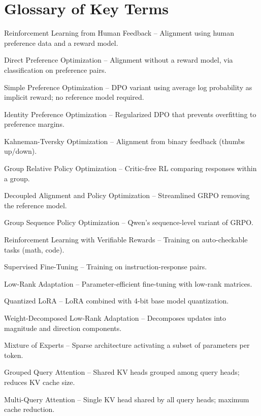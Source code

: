 \chapter{Glossary of Key Terms}

\begin{description}[style=nextline, leftmargin=2cm]
  \item[RLHF] Reinforcement Learning from Human Feedback -- Alignment using human preference data and a reward model.
  \item[DPO] Direct Preference Optimization -- Alignment without a reward model, via classification on preference pairs.
  \item[SimPO] Simple Preference Optimization -- DPO variant using average log probability as implicit reward; no reference model required.
  \item[IPO] Identity Preference Optimization -- Regularized DPO that prevents overfitting to preference margins.
  \item[KTO] Kahneman-Tversky Optimization -- Alignment from binary feedback (thumbs up/down).
  \item[GRPO] Group Relative Policy Optimization -- Critic-free RL comparing responses within a group.
  \item[DAPO] Decoupled Alignment and Policy Optimization -- Streamlined GRPO removing the reference model.
  \item[GSPO] Group Sequence Policy Optimization -- Qwen's sequence-level variant of GRPO.
  \item[RLVR] Reinforcement Learning with Verifiable Rewards -- Training on auto-checkable tasks (math, code).
  \item[SFT] Supervised Fine-Tuning -- Training on instruction-response pairs.
  \item[LoRA] Low-Rank Adaptation -- Parameter-efficient fine-tuning with low-rank matrices.
  \item[QLoRA] Quantized LoRA -- LoRA combined with 4-bit base model quantization.
  \item[DoRA] Weight-Decomposed Low-Rank Adaptation -- Decomposes updates into magnitude and direction components.
  \item[MoE] Mixture of Experts -- Sparse architecture activating a subset of parameters per token.
  \item[GQA] Grouped Query Attention -- Shared KV heads grouped among query heads; reduces KV cache size.
  \item[MQA] Multi-Query Attention -- Single KV head shared by all query heads; maximum cache reduction.

\end{description}
